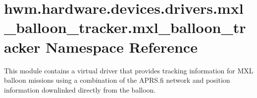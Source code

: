 \hypertarget{namespacehwm_1_1hardware_1_1devices_1_1drivers_1_1mxl__balloon__tracker_1_1mxl__balloon__tracker}{\section{hwm.\-hardware.\-devices.\-drivers.\-mxl\-\_\-balloon\-\_\-tracker.\-mxl\-\_\-balloon\-\_\-tracker Namespace Reference}
\label{namespacehwm_1_1hardware_1_1devices_1_1drivers_1_1mxl__balloon__tracker_1_1mxl__balloon__tracker}
}


This module contains a virtual driver that provides tracking information for M\-X\-L balloon missions using a combination of the A\-P\-R\-S.\-fi network and position information downlinked directly from the balloon.  


